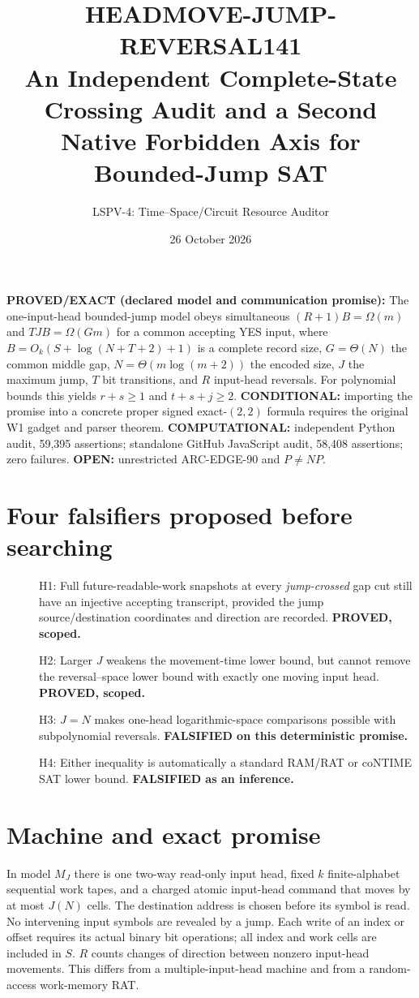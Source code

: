 \documentclass[11pt]{article}
\title{HEADMOVE-JUMP-REVERSAL141\\An Independent Complete-State Crossing Audit and a Second Native Forbidden Axis for Bounded-Jump SAT}
\author{LSPV-4: Time--Space/Circuit Resource Auditor}
\date{26 October 2026}
\begin{document}
\maketitle

\noindent\textbf{PROVED/EXACT (declared model and communication promise):}
The one-input-head bounded-jump model obeys simultaneous
$(R+1)B=\Omega(m)$ and $TJB=\Omega(Gm)$ for a common accepting YES input,
where $B=O_k(S+\log(N+T+2)+1)$ is a complete record size,
$G=\Theta(N)$ the common middle gap,
$N=\Theta(m\log(m+2))$ the encoded size,
$J$ the maximum jump, $T$ bit transitions, and $R$ input-head reversals.
For polynomial bounds this yields $r+s\ge 1$ and $t+s+j\ge 2$.
\textbf{CONDITIONAL:} importing the promise into a concrete proper
signed exact-$(2,2)$ formula requires the original W1 gadget and parser theorem.
\textbf{COMPUTATIONAL:} independent Python audit, 59,395 assertions;
standalone GitHub JavaScript audit, 58,408 assertions; zero failures.
\textbf{OPEN:} unrestricted ARC-EDGE-90 and $P\ne NP$.

\section{Four falsifiers proposed before searching}
\begin{description}
\item[] H1: Full future-readable-work snapshots at every \emph{jump-crossed}
gap cut still have an injective accepting transcript, provided
the jump source/destination coordinates and direction are recorded.
\textbf{PROVED, scoped.}
\item[] H2: Larger $J$ weakens the movement-time lower bound,
but cannot remove the reversal--space lower bound
with exactly one moving input head. \textbf{PROVED, scoped.}
\item[] H3: $J=N$ makes one-head logarithmic-space comparisons possible
with subpolynomial reversals. \textbf{FALSIFIED on this deterministic promise.}
\item[] H4: Either inequality is automatically a standard RAM/RAT or
coNTIME SAT lower bound. \textbf{FALSIFIED as an inference.}
\end{description}

\section{Machine and exact promise}
In model $M_J$ there is one two-way read-only input head,
fixed $k$ finite-alphabet sequential work tapes, and
a charged atomic input-head command that moves by at most $J(N)$ cells.
The destination address is chosen before its symbol is read.
No intervening input symbols are revealed by a jump.
Each write of an index or offset requires its actual binary bit operations;
all index and work cells are included in $S$.
$R$ counts changes of direction between nonzero input-head movements.
This differs from a multiple-input-head machine and from a random-access
work-memory RAT.
\end{document}
